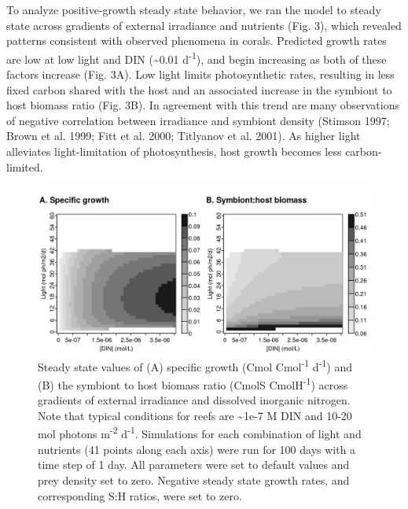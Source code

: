 \documentclass[]{elsarticle} %
\makeatletter
\def\maxwidth{\ifdim\Gin@nat@width>\linewidth\linewidth
\else\Gin@nat@width\fi}
\let\Oldincludegraphics\includegraphics
\renewcommand{\includegraphics}[1]{\Oldincludegraphics[width=\maxwidth]{#1}}
\makeatother
\begin{document}
To analyze positive-growth steady state behavior, we ran the model to
steady state across gradients of external irradiance and nutrients (Fig.
3), which revealed patterns consistent with observed phenomena in
corals. Predicted growth rates are low at low light and DIN
(\textasciitilde{}0.01 d\textsuperscript{-1}), and begin increasing as
both of these factors increase (Fig. 3A). Low light limits
photosynthetic rates, resulting in less fixed carbon shared with the
host and an associated increase in the symbiont to host biomass ratio
(Fig. 3B). In agreement with this trend are many observations of
negative correlation between irradiance and symbiont density (Stimson
1997; Brown et al. 1999; Fitt et al. 2000; Titlyanov et al. 2001). As
higher light alleviates light-limitation of photosynthesis, host growth
becomes less carbon-limited.

\begin{figure}[htbp]
\centering
\includegraphics{../img/Fig3.png}
\caption{Steady state values of (A) specific growth (Cmol
Cmol\textsuperscript{-1} d\textsuperscript{-1}) and (B) the symbiont to
host biomass ratio (CmolS CmolH\textsuperscript{-1}) across gradients of
external irradiance and dissolved inorganic nitrogen. Note that typical
conditions for reefs are \textasciitilde{}1e-7 M DIN and 10-20 mol
photons m\textsuperscript{-2} d\textsuperscript{-1}. Simulations for
each combination of light and nutrients (41 points along each axis) were
run for 100 days with a time step of 1 day. All parameters were set to
default values and prey density set to zero. Negative steady state
growth rates, and corresponding S:H ratios, were set to zero.}
\end{figure}
\end{document}
